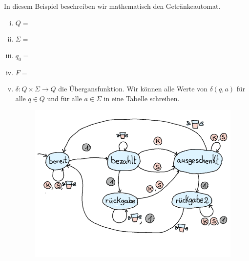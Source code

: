 %
%
In diesem Beispiel beschreiben wir mathematisch den Getränkeautomat.
{
\begin{enumerate}[(i)]
    \item \(Q =\) \blank[width=0.5\linewidth]{}
    \item \(\Sigma =\) \blank[width=0.5\linewidth]{}
    \item \(q_0 =\) \blank[width=0.5\linewidth]{}
    \item \(F =\) \blank[width=0.5\linewidth]{}
    \item \(\delta:Q \times \Sigma \rightarrow Q \) die Übergansfunktion.
    Wir können alle Werte von \(\delta(q,a)\) für alle \(q \in Q\) und für alle \(a \in \Sigma\) in eine Tabelle schreiben.
    \begin{figure}[H]
\centering
\includegraphics[width=0.5\linewidth]{Pictures/Getraenkeautomat.png}
\end{figure}
\end{enumerate}
}
